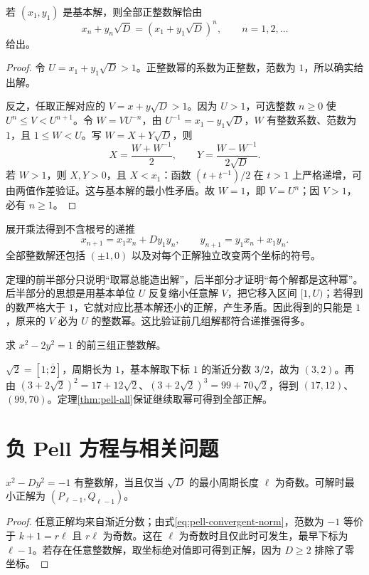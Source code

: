 \begin{theorem}
\label{thm:pell-all}
若 $(x_1,y_1)$ 是基本解，则全部正整数解恰由
\begin{equation}
 x_n+y_n\sqrt D=(x_1+y_1\sqrt D)^n,
 \qquad n=1,2,\ldots
 \label{eq:pell-all-solutions}
\end{equation}
给出。
\end{theorem}
\begin{proof}
令 $U=x_1+y_1\sqrt D>1$。正整数幂的系数为正整数，范数为 $1$，所以确实给出解。

反之，任取正解对应的 $V=x+y\sqrt D>1$。因为 $U>1$，可选整数 $n\ge0$ 使 $U^n\le V<U^{n+1}$。令 $W=VU^{-n}$，由 $U^{-1}=x_1-y_1\sqrt D$，$W$ 有整数系数、范数为 $1$，且 $1\le W<U$。写 $W=X+Y\sqrt D$，则
\[
 X=\frac{W+W^{-1}}2,\qquad
 Y=\frac{W-W^{-1}}{2\sqrt D}.
\]
若 $W>1$，则 $X,Y>0$，且 $X<x_1$：函数 $(t+t^{-1})/2$ 在 $t>1$ 上严格递增，可由两值作差验证。这与基本解的最小性矛盾。故 $W=1$，即 $V=U^n$；因 $V>1$，必有 $n\ge1$。
\end{proof}

展开乘法得到不含根号的递推
\[
 x_{n+1}=x_1x_n+Dy_1y_n,\qquad
 y_{n+1}=y_1x_n+x_1y_n.
\]
全部整数解还包括 $(\pm1,0)$ 以及对每个正解独立改变两个坐标的符号。

定理的前半部分只说明“取幂总能造出解”，后半部分才证明“每个解都是这种幂”。后半部分的思想是用基本单位 $U$ 反复缩小任意解 $V$，把它移入区间 $[1,U)$；若得到的数严格大于 $1$，它就对应比基本解还小的正解，产生矛盾。因此得到的只能是 $1$，原来的 $V$ 必为 $U$ 的整数幂。这比验证前几组解都符合递推强得多。

\begin{example}
求 $x^2-2y^2=1$ 的前三组正整数解。
\end{example}
\begin{solve}
$\sqrt2=[1;\overline2]$，周期长为 $1$，基本解取下标 $1$ 的渐近分数 $3/2$，故为 $(3,2)$。再由 $(3+2\sqrt2)^2=17+12\sqrt2$、$(3+2\sqrt2)^3=99+70\sqrt2$，得到 $(17,12)$、$(99,70)$。定理\ref{thm:pell-all}保证继续取幂可得到全部正解。
\end{solve}

\section{负 Pell 方程与相关问题}

\begin{proposition}
\label{prop:negative-pell}
$x^2-Dy^2=-1$ 有整数解，当且仅当 $\sqrt D$ 的最小周期长度 $\ell$ 为奇数。可解时最小正解为 $(P_{\ell-1},Q_{\ell-1})$。
\end{proposition}
\begin{proof}
任意正解均来自渐近分数；由式\eqref{eq:pell-convergent-norm}，范数为 $-1$ 等价于 $k+1=r\ell$ 且 $r\ell$ 为奇数。这在 $\ell$ 为奇数时且仅此时可发生，最早下标为 $\ell-1$。若存在任意整数解，取坐标绝对值即可得到正解，因为 $D\ge2$ 排除了零坐标。
\end{proof}

